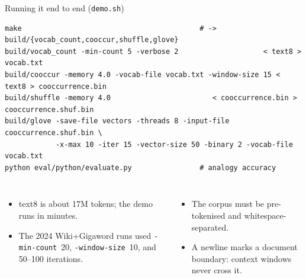 \documentclass[aspectratio=169,11pt]{beamer}
\newcommand{\file}[1]{\texttt{#1}}
\newcommand{\opt}[1]{\texttt{-#1}}
\begin{document}
\begin{frame}[fragile]{Running it end to end (\file{demo.sh})}
\begin{lstlisting}[style=sh]
make                                          # -> build/{vocab_count,cooccur,shuffle,glove}
build/vocab_count -min-count 5 -verbose 2                    < text8 > vocab.txt
build/cooccur -memory 4.0 -vocab-file vocab.txt -window-size 15 < text8 > cooccurrence.bin
build/shuffle -memory 4.0                        < cooccurrence.bin > cooccurrence.shuf.bin
build/glove -save-file vectors -threads 8 -input-file cooccurrence.shuf.bin \
            -x-max 10 -iter 15 -vector-size 50 -binary 2 -vocab-file vocab.txt
python eval/python/evaluate.py                # analogy accuracy
\end{lstlisting}
\begin{columns}[T]
\small
\begin{itemize}
  \item text8 is about 17M tokens; the demo runs in minutes.
  \item The 2024 Wiki+Gigaword runs used \opt{min-count}~20, \opt{window-size}~10, and 50--100 iterations.
\end{itemize}
\small
\begin{itemize}
  \item The corpus must be \alert{pre-tokenised} and whitespace-separated.
  \item A newline marks a \alert{document boundary}: context windows never cross it.
\end{itemize}
\end{columns}
\end{frame}
\end{document}

